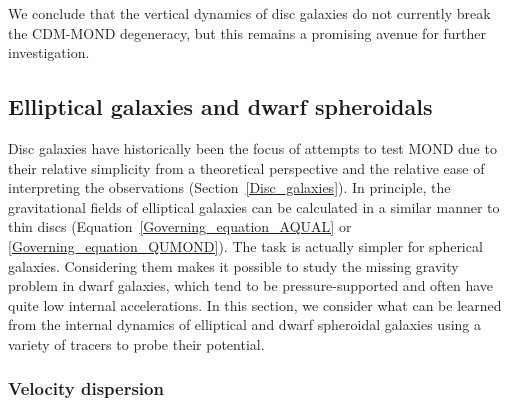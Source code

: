 \documentclass[fleqn,usenatbib,useAMS]{mnras} %
\begin{document}
We conclude that the vertical dynamics of disc galaxies do not currently break the CDM-MOND degeneracy, but this remains a promising avenue for further investigation.



\subsection{Elliptical galaxies and dwarf spheroidals}
\label{Elliptical_galaxies}

Disc galaxies have historically been the focus of attempts to test MOND due to their relative simplicity from a theoretical perspective and the relative ease of interpreting the observations (Section~\ref{Disc_galaxies}). In principle, the gravitational fields of elliptical galaxies can be calculated in a similar manner to thin discs (Equation~\ref{Governing_equation_AQUAL} or \ref{Governing_equation_QUMOND}). The task is actually simpler for spherical galaxies. Considering them makes it possible to study the missing gravity problem in dwarf galaxies, which tend to be pressure-supported and often have quite low internal accelerations. In this section, we consider what can be learned from the internal dynamics of elliptical and dwarf spheroidal galaxies using a variety of tracers to probe their potential.


\subsubsection{Velocity dispersion}
\label{Galaxy_internal_sigma}
\end{document}
